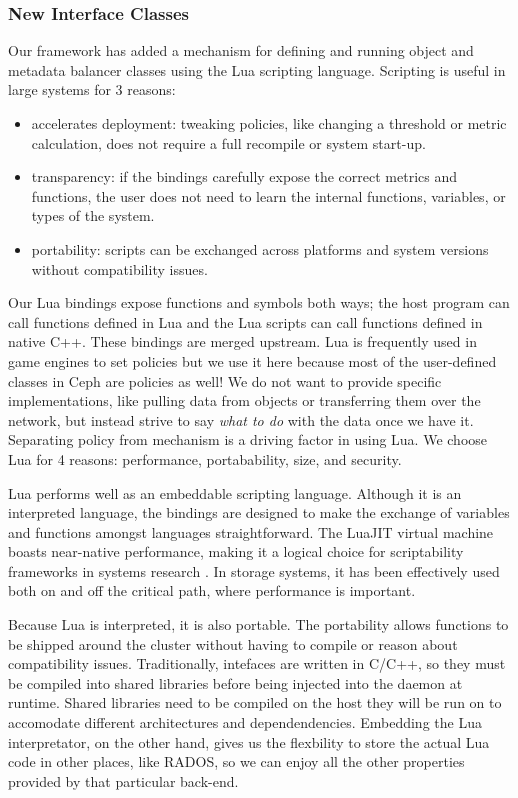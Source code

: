 \documentclass[10pt,twocolumn]{article}
\begin{document}
\subsubsection{New Interface Classes}\label{new-interface-classes}

Our framework has added a mechanism for defining and running object and
metadata balancer classes using the Lua scripting language. Scripting is
useful in large systems for 3 reasons:

\begin{itemize}
\item
  accelerates deployment: tweaking policies, like changing a threshold
  or metric calculation, does not require a full recompile or system
  start-up.
\item
  transparency: if the bindings carefully expose the correct metrics and
  functions, the user does not need to learn the internal functions,
  variables, or types of the system.
\item
  portability: scripts can be exchanged across platforms and system
  versions without compatibility issues.
\end{itemize}

Our Lua bindings expose functions and symbols both ways; the host
program can call functions defined in Lua and the Lua scripts can call
functions defined in native C++. These bindings are merged upstream. Lua
is frequently used in game engines to set policies but we use it here
because most of the user-defined classes in Ceph are policies as well!
We do not want to provide specific implementations, like pulling data
from objects or transferring them over the network, but instead strive
to say \emph{what to do} with the data once we have it. Separating
policy from mechanism is a driving factor in using Lua. We choose Lua
for 4 reasons: performance, portabability, size, and security.

Lua performs well as an embeddable scripting language. Although it is an
interpreted language, the bindings are designed to make the exchange of
variables and functions amongst languages straightforward. The LuaJIT
virtual machine boasts near-native performance, making it a logical
choice for scriptability frameworks in systems research
\cite{neto:dls14-luaos}. In storage systems, it has been effectively
used both on \cite{grawinkel:pdsw2012-lua,watkins2013:bdmc13-in-vivo} and off
\cite{sevilla:sc15-mantle} the critical path, where performance is
important.

Because Lua is interpreted, it is also portable. The portability allows
functions to be shipped around the cluster without having to compile or
reason about compatibility issues. Traditionally, intefaces are written
in C/C++, so they must be compiled into shared libraries before being
injected into the daemon at runtime. Shared libraries need to be
compiled on the host they will be run on to accomodate different
architectures and dependendencies. Embedding the Lua interpretator, on
the other hand, gives us the flexbility to store the actual Lua code in
other places, like RADOS, so we can enjoy all the other properties
provided by that particular back-end.
\end{document}
